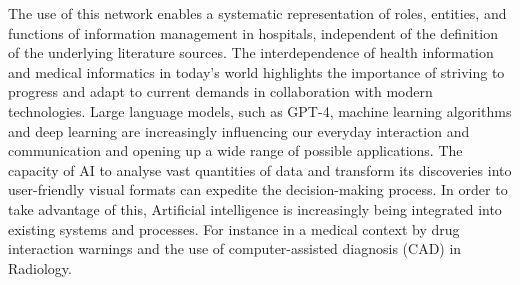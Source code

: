 The use of this network enables a systematic representation of roles, entities, and functions of information management in hospitals, independent of the definition of the underlying literature sources. 
The interdependence of health information and medical informatics in today's world highlights the importance of striving to progress and adapt to current demands in collaboration with modern technologies.
%
%
Large language models, such as GPT-4, machine learning algorithms and deep learning are increasingly influencing our everyday interaction and communication and opening up a wide range of possible applications. 
The capacity of AI to analyse vast quantities of data and transform its discoveries into user-friendly visual formats can expedite the decision-making process. 
In order to take advantage of this, Artificial intelligence is increasingly being integrated into existing systems and processes.
For instance in a medical context by drug interaction warnings\citep{akyon_polypharmacy_2023} and the use of computer-assisted diagnosis (CAD) in Radiology\citep{amisha_ai_medicine_2019}.
%

